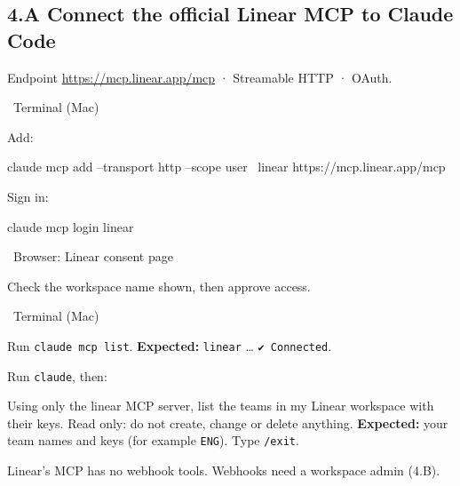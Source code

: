 \documentclass[11pt,a4paper]{article}
\newcommand{\where}[1]{\par\smallskip\noindent\colorbox{winbg}{\color{winfg}\bfseries\strut\ #1\ }\par\nopagebreak[4]}
\newcommand{\lit}[1]{\texttt{#1}}
\newenvironment{prompt}{\def\FrameCommand{\fboxsep=6pt\fcolorbox{Gray}{okbg}}\MakeFramed{\advance\hsize-\width\FrameRestore}\raggedright}{\endMakeFramed}
\begin{document}
\subsection*{4.A Connect the official Linear MCP to Claude Code}
Endpoint \url{https://mcp.linear.app/mcp} · Streamable HTTP · OAuth.
\where{Terminal (Mac)}
\begin{steps}
\item Add:
\begin{cmd}
claude mcp add --transport http --scope user \
  linear https://mcp.linear.app/mcp
\end{cmd}
\item Sign in:
\begin{cmd}
claude mcp login linear
\end{cmd}
\where{Browser: Linear consent page}
\item Check the workspace name shown, then approve access.
\where{Terminal (Mac)}
\item Run \lit{claude mcp list}. \textbf{Expected:} \lit{linear} … \lit{✔ Connected}.
\item Run \lit{claude}, then:
\begin{prompt}
Using only the linear MCP server, list the teams in my Linear workspace with their keys. Read only: do not create, change or delete anything.
\end{prompt}
\textbf{Expected:} your team names and keys (for example \lit{ENG}). Type \lit{/exit}.
\end{steps}
Linear's MCP has no webhook tools. Webhooks need a workspace admin (4.B).
\end{document}
